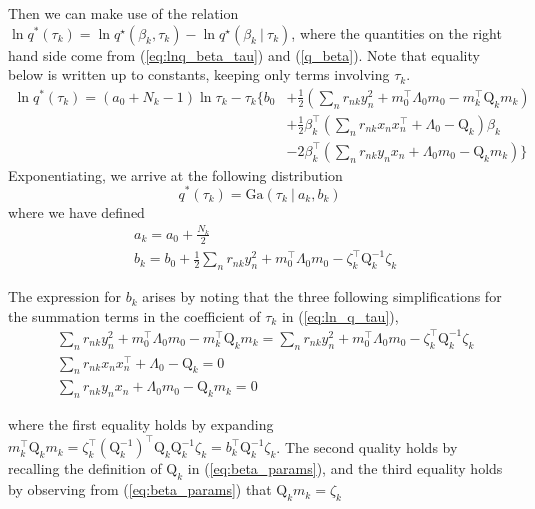 \documentclass[twoside,11pt]{article}
\newcommand\given[1][]{\:#1\vert\:}
\newcommand{\transpose}[1]{#1^{\intercal}}
\begin{document}
Then we can make use of the relation $\ln q^{*}(\tau_k) = \ln q^{\star}(\beta_k, \tau_k) -  \ln q^{\star}(\beta_k \given \tau_k)$, where the quantities on the right hand side come from (\ref{eq:lnq_beta_tau}) and (\ref{q_beta}). Note that equality below is written up to constants, keeping only terms involving $\tau_k$. 
\begin{equation}\label{eq:ln_q_tau}
\begin{split}
	 \ln q^{*}(\tau_k) = (a_0 + N_k - 1) \ln \tau_k - \tau_k \Bigg\{ b_0 & + \frac{1}{2} \left( \sum_{n}r_{nk}y_n^2 + \transpose{m_0} \Lambda_0 m_0 - \transpose{m_k} \mathrm{Q}_k m_k \right) \\
	 & + \frac{1}{2} \transpose{\beta_k} \left( \sum_{n} r_{nk} x_n \transpose{x_n} + \Lambda_0 - \mathrm{Q}_k \right) \beta_k \\
	 & - 2 \transpose{\beta_k} \left( \sum_{n} r_{nk} y_n x_n + \Lambda_0 m_0 - \mathrm{Q}_k m_k \right) \Bigg\}
\end{split}
\end{equation}
Exponentiating, we arrive at the following distribution
\begin{equation} \label{eq:q_tau}
	q^{*}(\tau_k) =  \mathrm{Ga}\left( \tau_k \given a_k, b_k \right)
\end{equation}
where we have defined
\begin{equation} \label{eq:tau_params}
\begin{split}
	& a_k = a_0 + \frac{N_k}{2} \\
	& b_k = b_0 + \frac{1}{2} \sum_{n} r_{nk} y_n^2 + \transpose{m_0} \Lambda_0 m_0 - \transpose{\zeta_k} \mathrm{Q}_k^{-1} \zeta_k
\end{split}
\end{equation}

The expression for $b_k$ arises by noting that the three following simplifications for the summation terms in the coefficient of $\tau_k$ in (\ref{eq:ln_q_tau}), 
\begin{align*}
	& \sum_{n}r_{nk}y_n^2 + \transpose{m_0} \Lambda_0 m_0 - \transpose{m_k} \mathrm{Q}_k m_k =  \sum_{n}r_{nk}y_n^2 + \transpose{m_0} \Lambda_0 m_0 -\transpose{\zeta_k} \mathrm{Q}_k^{-1} \zeta_k \\
	& \sum_{n} r_{nk} x_n \transpose{x_n} + \Lambda_0 - \mathrm{Q}_k = 0 \\
	& \sum_{n} r_{nk} y_n x_n + \Lambda_0 m_0 - \mathrm{Q}_k m_k = 0
\end{align*}

where the first equality holds by expanding $\transpose{m_k} \mathrm{Q}_k m_k = \transpose{\zeta_k} \left( \mathrm{Q}_k^{-1}\right)^{\intercal} \mathrm{Q}_k \mathrm{Q}_k^{-1} \zeta_k = \transpose{b_k} \mathrm{Q}_k^{-1} \zeta_k$. The second quality holds by recalling the definition of $\mathrm{Q}_k$ in (\ref{eq:beta_params}), and the third equality holds by observing from (\ref{eq:beta_params}) that $\mathrm{Q}_{k} m_k = \zeta_k$
\end{document}
